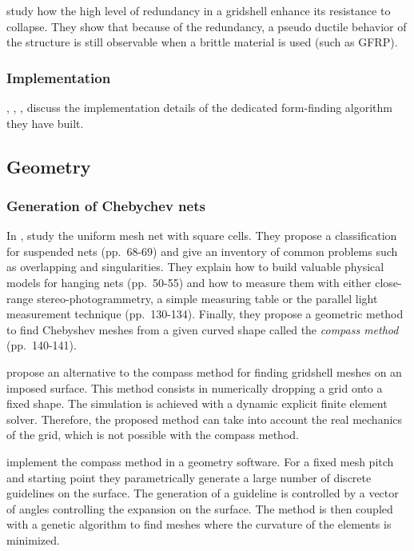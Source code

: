 \citet{Tayeb2013} study how the high level of redundancy in a gridshell enhance its resistance to collapse. They show that because of the redundancy, a pseudo ductile behavior of the structure is still observable when a brittle material is used (such as GFRP).

\subsubsection{Implementation}

, , ,  discuss the implementation details of the dedicated form-finding algorithm they have built.

\subsection{Geometry}

\subsubsection{Generation of Chebychev nets}

In ,  study the uniform mesh net with square cells. They propose a classification for suspended nets (pp.~68-69) and give an inventory of common problems such as overlapping and singularities. They explain how to build valuable physical models for hanging nets (pp.~50-55) and how to measure them with either close-range stereo-photogrammetry, a simple measuring table or the parallel light measurement technique (pp.~130-134). Finally, they propose a geometric method to find Chebyshev meshes from a given curved shape called the \emph{compass method} (pp.~140-141).

 propose an alternative to the compass method for finding gridshell meshes on an imposed surface. This method consists in numerically dropping a grid onto a fixed shape. The simulation is achieved with a dynamic explicit finite element solver. Therefore, the proposed method can take into account the real mechanics of the grid, which is not possible with the compass method.

 implement the compass method in a geometry software. For a fixed mesh pitch and starting point they parametrically generate a large number of discrete guidelines on the surface. The generation of a guideline is controlled by a vector of angles controlling the expansion on the surface. The method is then coupled with a genetic algorithm to find meshes where the curvature of the elements is minimized.

